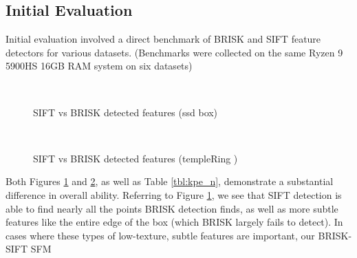 \documentclass[conference,compsoc]{IEEEtran}
\begin{document}
\subsection{Initial Evaluation}
Initial evaluation involved a direct benchmark of 
BRISK and SIFT feature detectors for various datasets. 
(Benchmarks were collected on the same Ryzen 9 5900HS 16GB RAM system on six datasets)
\begin{figure}[ht!]
    \centering
    \
    \caption{SIFT vs BRISK detected features (ssd box)}
    \label{fig:br_vs_si}
\end{figure}
\begin{figure}[ht!]
    \centering
    \
    \caption{SIFT vs BRISK detected features (templeRing \cite{temple})}
    \label{fig:brt_vs_sit}
\end{figure}
Both Figures \ref{fig:br_vs_si} and \ref{fig:brt_vs_sit}, as well as Table \ref{tbl:kpe_n}, 
demonstrate a substantial difference in overall ability. Referring to Figure \ref{fig:br_vs_si}, we see that 
SIFT detection is able to find nearly all the points BRISK detection finds, 
as well as
more subtle features like the entire edge of the box (which BRISK largely fails to detect).
In cases where these types of low-texture, subtle features are important, our BRISK-SIFT SFM 
\end{document}
